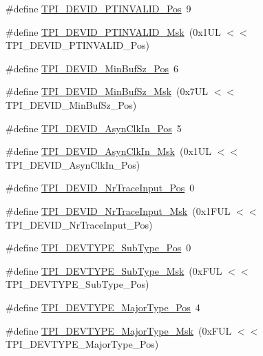\begin{DoxyCompactItemize}
\item 
\#define \hyperlink{group___c_m_s_i_s___t_p_i_ga974cccf4c958b4a45cb71c7b5de39b7b}{T\+P\+I\+\_\+\+D\+E\+V\+I\+D\+\_\+\+P\+T\+I\+N\+V\+A\+L\+I\+D\+\_\+\+Pos}~9
\item 
\#define \hyperlink{group___c_m_s_i_s___t_p_i_ga1ca84d62243e475836bba02516ba6b97}{T\+P\+I\+\_\+\+D\+E\+V\+I\+D\+\_\+\+P\+T\+I\+N\+V\+A\+L\+I\+D\+\_\+\+Msk}~(0x1\+U\+L $<$$<$ T\+P\+I\+\_\+\+D\+E\+V\+I\+D\+\_\+\+P\+T\+I\+N\+V\+A\+L\+I\+D\+\_\+\+Pos)
\item 
\#define \hyperlink{group___c_m_s_i_s___t_p_i_ga3f7da5de2a34be41a092e5eddd22ac4d}{T\+P\+I\+\_\+\+D\+E\+V\+I\+D\+\_\+\+Min\+Buf\+Sz\+\_\+\+Pos}~6
\item 
\#define \hyperlink{group___c_m_s_i_s___t_p_i_ga939e068ff3f1a65b35187ab34a342cd8}{T\+P\+I\+\_\+\+D\+E\+V\+I\+D\+\_\+\+Min\+Buf\+Sz\+\_\+\+Msk}~(0x7\+U\+L $<$$<$ T\+P\+I\+\_\+\+D\+E\+V\+I\+D\+\_\+\+Min\+Buf\+Sz\+\_\+\+Pos)
\item 
\#define \hyperlink{group___c_m_s_i_s___t_p_i_gab382b1296b5efd057be606eb8f768df8}{T\+P\+I\+\_\+\+D\+E\+V\+I\+D\+\_\+\+Asyn\+Clk\+In\+\_\+\+Pos}~5
\item 
\#define \hyperlink{group___c_m_s_i_s___t_p_i_gab67830557d2d10be882284275025a2d3}{T\+P\+I\+\_\+\+D\+E\+V\+I\+D\+\_\+\+Asyn\+Clk\+In\+\_\+\+Msk}~(0x1\+U\+L $<$$<$ T\+P\+I\+\_\+\+D\+E\+V\+I\+D\+\_\+\+Asyn\+Clk\+In\+\_\+\+Pos)
\item 
\#define \hyperlink{group___c_m_s_i_s___t_p_i_ga80ecae7fec479e80e583f545996868ed}{T\+P\+I\+\_\+\+D\+E\+V\+I\+D\+\_\+\+Nr\+Trace\+Input\+\_\+\+Pos}~0
\item 
\#define \hyperlink{group___c_m_s_i_s___t_p_i_gabed454418d2140043cd65ec899abd97f}{T\+P\+I\+\_\+\+D\+E\+V\+I\+D\+\_\+\+Nr\+Trace\+Input\+\_\+\+Msk}~(0x1\+F\+U\+L $<$$<$ T\+P\+I\+\_\+\+D\+E\+V\+I\+D\+\_\+\+Nr\+Trace\+Input\+\_\+\+Pos)
\item 
\#define \hyperlink{group___c_m_s_i_s___t_p_i_ga0c799ff892af5eb3162d152abc00af7a}{T\+P\+I\+\_\+\+D\+E\+V\+T\+Y\+P\+E\+\_\+\+Sub\+Type\+\_\+\+Pos}~0
\item 
\#define \hyperlink{group___c_m_s_i_s___t_p_i_ga5b2fd7dddaf5f64855d9c0696acd65c1}{T\+P\+I\+\_\+\+D\+E\+V\+T\+Y\+P\+E\+\_\+\+Sub\+Type\+\_\+\+Msk}~(0x\+F\+U\+L $<$$<$ T\+P\+I\+\_\+\+D\+E\+V\+T\+Y\+P\+E\+\_\+\+Sub\+Type\+\_\+\+Pos)
\item 
\#define \hyperlink{group___c_m_s_i_s___t_p_i_ga69c4892d332755a9f64c1680497cebdd}{T\+P\+I\+\_\+\+D\+E\+V\+T\+Y\+P\+E\+\_\+\+Major\+Type\+\_\+\+Pos}~4
\item 
\#define \hyperlink{group___c_m_s_i_s___t_p_i_gaecbceed6d08ec586403b37ad47b38c88}{T\+P\+I\+\_\+\+D\+E\+V\+T\+Y\+P\+E\+\_\+\+Major\+Type\+\_\+\+Msk}~(0x\+F\+U\+L $<$$<$ T\+P\+I\+\_\+\+D\+E\+V\+T\+Y\+P\+E\+\_\+\+Major\+Type\+\_\+\+Pos)
\end{DoxyCompactItemize}


